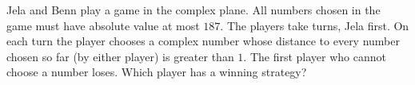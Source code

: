 Jela and Benn play a game in the complex plane. All numbers chosen in the game must have absolute value at most $187$. The players take turns, Jela first. On each turn the player chooses a complex number whose distance to every number chosen so far (by either player) is greater than $1$. The first player who cannot choose a number loses. Which player has a winning strategy?
